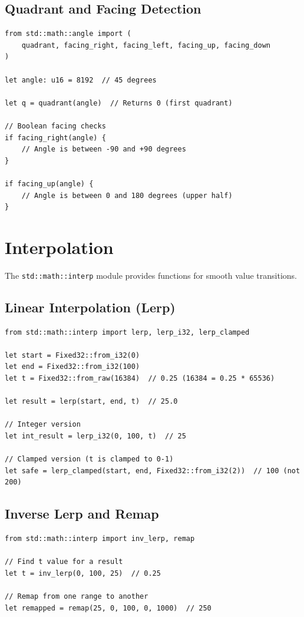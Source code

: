 \subsection{Quadrant and Facing Detection}

\begin{lstlisting}
from std::math::angle import (
    quadrant, facing_right, facing_left, facing_up, facing_down
)

let angle: u16 = 8192  // 45 degrees

let q = quadrant(angle)  // Returns 0 (first quadrant)

// Boolean facing checks
if facing_right(angle) {
    // Angle is between -90 and +90 degrees
}

if facing_up(angle) {
    // Angle is between 0 and 180 degrees (upper half)
}
\end{lstlisting}

\section{Interpolation}
\label{sec:math-interp}

The \texttt{std::math::interp} module provides functions for smooth value transitions.

\subsection{Linear Interpolation (Lerp)}

\begin{lstlisting}
from std::math::interp import lerp, lerp_i32, lerp_clamped

let start = Fixed32::from_i32(0)
let end = Fixed32::from_i32(100)
let t = Fixed32::from_raw(16384)  // 0.25 (16384 = 0.25 * 65536)

let result = lerp(start, end, t)  // 25.0

// Integer version
let int_result = lerp_i32(0, 100, t)  // 25

// Clamped version (t is clamped to 0-1)
let safe = lerp_clamped(start, end, Fixed32::from_i32(2))  // 100 (not 200)
\end{lstlisting}

\subsection{Inverse Lerp and Remap}

\begin{lstlisting}
from std::math::interp import inv_lerp, remap

// Find t value for a result
let t = inv_lerp(0, 100, 25)  // 0.25

// Remap from one range to another
let remapped = remap(25, 0, 100, 0, 1000)  // 250
\end{lstlisting}

